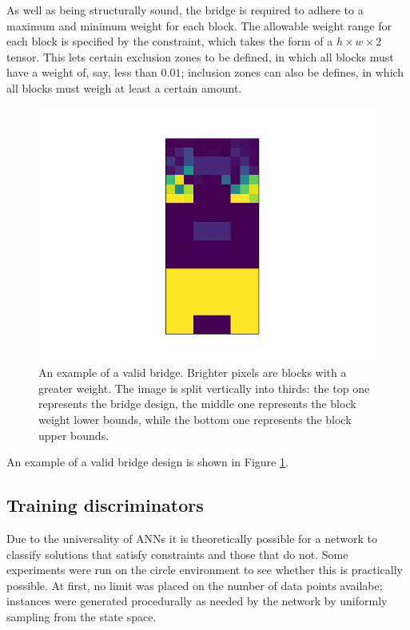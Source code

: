 \documentclass[a4paper]{article}
\begin{document}
As well as being structurally sound, the bridge is required to adhere to a maximum and minimum weight for each block.
The allowable weight range for each block is specified by the constraint, which takes the form of a $h \times w \times 2$ tensor.
This lets certain exclusion zones to be defined, in which all blocks must have a weight of, say, less than $0.01$;
inclusion zones can also be defines, in which all blocks must weigh at least a certain amount.

\begin{figure}
\centering
\includegraphics[scale=0.6]{../../figures/validbridges/valid_bridge_9.png}
\caption{
  An example of a valid bridge.
  Brighter pixels are blocks with a greater weight.
  The image is split vertically into thirds:
  the top one represents the bridge design,
  the middle one represents the block weight lower bounds,
  while the bottom one represents the block upper bounds.}
\label{fig:validBridgeExample}
\end{figure}

An example of a valid bridge design is shown in Figure \ref{fig:validBridgeExample}.

\subsection{Training discriminators}

Due to the universality of ANNs \cite{hornik91} it is theoretically possible for a network to classify solutions that satisfy constraints and those that do not.
Some experiments were run on the circle environment to see whether this is practically possible.
At first, no limit was placed on the number of data points availabe; instances were generated procedurally as needed by the network
by uniformly sampling from the state space.
\end{document}
